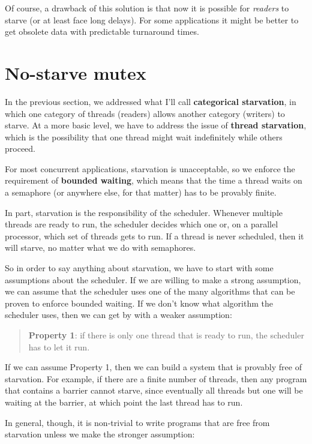 Of course, a drawback of this solution is that now it is
possible for {\em readers} to starve (or at least face long
delays).  For some applications it might be better to get
obsolete data with predictable turnaround times.



\clearemptydoublepage
\section{No-starve mutex}
\label{props}

In the previous section, we addressed what I'll call
{\bf categorical starvation}, in which one category of threads
(readers) allows another category (writers) to starve.
At a more basic level, we have to address the issue of
{\bf thread starvation}, which is the possibility that one
thread might wait indefinitely while others proceed.

For most concurrent applications, starvation is unacceptable,
so we enforce the requirement of {\bf bounded waiting}, which
means that the time a thread waits on a semaphore (or anywhere
else, for that matter) has to be provably finite.

In part, starvation is the responsibility of the scheduler.
Whenever multiple threads are ready to run, the scheduler decides
which one or, on a parallel processor, which set of threads gets
to run.  If a thread is never scheduled, then it will starve,
no matter what we do with semaphores.

So in order to say anything about starvation, we have to start
with some assumptions about the scheduler.  If we are willing
to make a strong assumption, we can assume that the scheduler
uses one of the many algorithms that can be proven to enforce
bounded waiting.  If we don't know what algorithm the scheduler
uses, then we can get by with a weaker assumption:

\begin{quote}
\textbf{Property 1}: if there is only one thread that is ready to
run, the scheduler has to let it run.
\end{quote}

If we can assume Property 1, then we can build a system
that is provably free of starvation.  For example, if there
are a finite number of threads, then any program that contains
a barrier cannot starve, since eventually all threads but one
will be waiting at the barrier, at which point the last thread
has to run.

In general, though, it is non-trivial to write programs that
are free from starvation unless we make the stronger
assumption:

